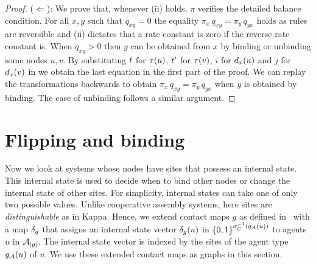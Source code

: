 \begin{proof}
  ($\Leftarrow$):
  We prove that, whenever (ii) holds,
  $\pi$ verifies the detailed balance condition.
  For all $x,y$ such that $q_{xy} = 0$
  the equality $\pi_x\,q_{xy} = \pi_y\,q_{yx}$ holds
  as rules are reversible and (ii) dictates that
  a rate constant is zero if the reverse rate constant is.
  When $q_{xy} > 0$ then $y$ can be obtained from $x$
  by binding or unbinding some nodes $u,v$.
  By substituting $t$ for $\tau(u)$, $t'$ for $\tau(v)$,
  $i$ for $d_x(u)$ and $j$ for $d_x(v)$
  in  we obtain the last equation
  in the first part of the proof.
  We can replay the transformations backwards
  to obtain $\pi_x\,q_{xy} = \pi_y\,q_{yx}$
  when $y$ is obtained by binding.
  The case of unbinding follows a similar argument.
\end{proof}


\section{Flipping and binding} %
\label{sec:fb}

Now we look at systems whose nodes have sites
that possess an internal state.
This internal state is used to decide when to bind other nodes
or change the internal state of other sites.
For simplicity, internal states can
take one of only two possible values. %
Unlike cooperative assembly systems,
here sites are \emph{distinguishable}
as in Kappa.
Hence, we extend contact maps $g$ as defined in~
with a map $\delta_g$
that assigns an internal state vector
$\delta_g(u)$ in $\left\{ 0,1 \right\}^{\sigma_C^{-1}(g_{\mathcal{A}}(u))}$
to agents $u$ in $\mathcal{A}_{\left|g\right|}$.
The internal state vector is indexed by
the sites of the agent type $g_{\mathcal{A}}(u)$ of $u$.
We use these extended contact maps as graphs in this section.


